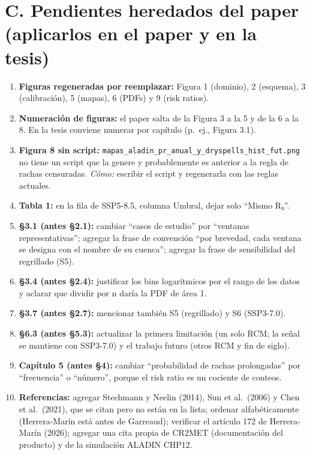 \section*{C. Pendientes heredados del paper (aplicarlos en el paper y en la tesis)}\label{c.-pendientes-heredados-del-paper-aplicarlos-en-el-paper-y-en-la-tesis}

\begin{enumerate}
\def\labelenumi{\arabic{enumi}.}
\tightlist
\item
  \textbf{Figuras regeneradas por reemplazar:} Figura 1 (dominio), 2 (esquema), 3 (calibración), 5 (mapas), 6 (PDFs) y 9 (risk ratios).
\item
  \textbf{Numeración de figuras:} el paper salta de la Figura 3 a la 5 y de la 6 a la 8. En la tesis conviene numerar por capítulo (p.~ej., Figura 3.1).
\item
  \textbf{Figura 8 sin script:} \texttt{mapas\_aladin\_pr\_anual\_y\_dryspells\_hist\_fut.png} no tiene un script que la genere y probablemente es anterior a la regla de rachas censuradas. \emph{Cómo:} escribir el script y regenerarla con las reglas actuales.
\item
  \textbf{Tabla 1:} en la fila de SSP5-8.5, columna Umbral, dejar solo ``Mismo R₀''.
\item
  \textbf{§3.1 (antes §2.1):} cambiar ``casos de estudio'' por ``ventanas representativas''; agregar la frase de convención ``por brevedad, cada ventana se designa con el nombre de su cuenca''; agregar la frase de sensibilidad del regrillado (S5).
\item
  \textbf{§3.4 (antes §2.4):} justificar los bins logarítmicos por el rango de los datos y aclarar que dividir por n daría la PDF de área 1.
\item
  \textbf{§3.7 (antes §2.7):} mencionar también S5 (regrillado) y S6 (SSP3-7.0).
\item
  \textbf{§6.3 (antes §5.3):} actualizar la primera limitación (un solo RCM; la señal se mantiene con SSP3-7.0) y el trabajo futuro (otros RCM y fin de siglo).
\item
  \textbf{Capítulo 5 (antes §4):} cambiar ``probabilidad de rachas prolongadas'' por ``frecuencia'' o ``número'', porque el risk ratio es un cociente de conteos.
\item
  \textbf{Referencias:} agregar Stechmann y Neelin (2014), Sun et al.~(2006) y Chen et al.~(2021), que se citan pero no están en la lista; ordenar alfabéticamente (Herrera-Marín está antes de Garreaud); verificar el artículo 172 de Herrera-Marín (2026); agregar una cita propia de CR2MET (documentación del producto) y de la simulación ALADIN CHP12.

\end{enumerate}
